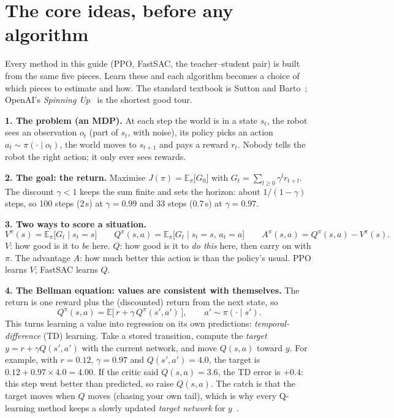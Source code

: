 \documentclass[10pt,letterpaper]{article}
\begin{document}
\section{The core ideas, before any algorithm}\label{sec:core}

Every method in this guide (PPO, FastSAC, the teacher–student pair) is built from the same five pieces. Learn these and each
algorithm becomes a choice of which pieces to estimate and how. The standard textbook is Sutton and Barto~\cite{sutton2018};
OpenAI's \emph{Spinning Up}~\cite{spinningup} is the shortest good tour.

\textbf{1. The problem (an MDP).} At each step the world is in a state $s_t$, the robot sees an observation $o_t$ (part of $s_t$,
with noise), its policy picks an action $a_t\sim\pi(\cdot\mid o_t)$, the world moves to $s_{t+1}$ and pays a reward $r_t$.
Nobody tells the robot the right action; it only ever sees rewards.

\textbf{2. The goal: the return.} Maximise $J(\pi)=\mathbb{E}_\pi\big[G_0\big]$ with $G_t=\sum_{l\ge0}\gamma^l r_{t+l}$. The discount
$\gamma<1$ keeps the sum finite and sets the horizon: about $1/(1-\gamma)$ steps, so 100 steps (2\,s) at $\gamma=0.99$ and 33
steps (0.7\,s) at $\gamma=0.97$.

\textbf{3. Two ways to score a situation.}
\[
V^\pi(s)=\mathbb{E}_\pi\big[G_t\mid s_t=s\big]\qquad
Q^\pi(s,a)=\mathbb{E}_\pi\big[G_t\mid s_t=s,\,a_t=a\big]\qquad
A^\pi(s,a)=Q^\pi(s,a)-V^\pi(s).
\]
$V$: how good is it to \emph{be} here. $Q$: how good is it to \emph{do this} here, then carry on with $\pi$. The advantage $A$: how
much better this action is than the policy's usual. PPO learns $V$; FastSAC learns $Q$.

\textbf{4. The Bellman equation: values are consistent with themselves.} The return is one reward plus the (discounted) return
from the next state, so
\[
Q^\pi(s,a)=\mathbb{E}\big[\,r+\gamma\,Q^\pi(s',a')\,\big],\qquad a'\sim\pi(\cdot\mid s').
\]
This turns learning a value into regression on its own predictions: \emph{temporal-difference} (TD) learning. Take a stored
transition, compute the \emph{target} $y=r+\gamma Q(s',a')$ with the current network, and move $Q(s,a)$ toward $y$.
For example, with $r=0.12$, $\gamma=0.97$ and $Q(s',a')=4.0$, the target is $0.12+0.97\times4.0=4.00$. If the critic said
$Q(s,a)=3.6$, the TD error is $+0.4$: this step went better than predicted, so raise $Q(s,a)$.
The catch is that the target moves when $Q$ moves (chasing your own tail), which is why every Q-learning method keeps a slowly
updated \emph{target network} for $y$~\cite{mnih2015}.
\end{document}

